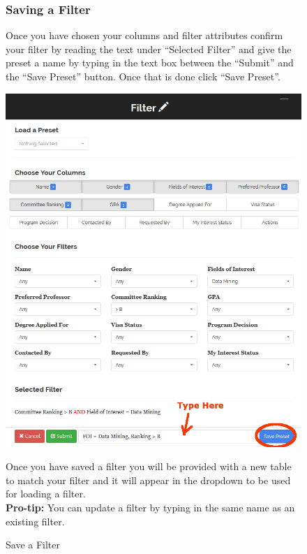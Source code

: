 \documentclass[fontsize=12pt,paper=letter,twoside]{scrartcl}
\begin{document}
\begin{figure}[!htb]
\subsubsection{Saving a Filter}
Once you have chosen your columns and filter attributes confirm your filter by reading the text under ``Selected Filter'' and give the preset a name by typing in the text box between the ``Submit'' and the ``Save Preset'' button. Once that is done click ``Save Preset''.
\begin{center}
\includegraphics[width=.99\textwidth]{images/prof/save_filter.png}
\end{center}
\caption{Save a Filter}
Once you have saved a filter you will be provided with a new table to match your filter and it will appear in the dropdown to be used for loading a filter.\\
\textbf{Pro-tip:} You can update a filter by typing in the same name as an existing filter.
\label{fig:prof/save_filter}
\end{figure}

\clearpage
\end{document}
